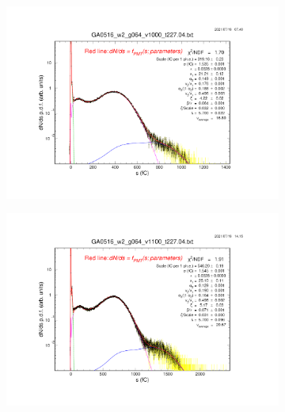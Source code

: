 \begin{figure}[b]
	\centering
	\begin{subfigure}[c]{0.42\linewidth}
		\centering
		\includegraphics[width=\linewidth, trim={6cm 6cm 75mm 85mm},clip]{figures/GA0516_w2_g064_v1000_6mm_log.04.png}
		\vspace{0mm}
	\end{subfigure}%
	\begin{subfigure}[c]{0.42\linewidth}
		\centering
		\includegraphics[width=\linewidth, trim={75mm 6cm 6cm 85mm},clip]{figures/GA0516_w2_g064_v1100_6mm_log.04.png}
		\vspace{0mm}
	\end{subfigure}%
	\vspace{0mm}
	\begin{subfigure}[c]{0.42\linewidth}

\end{subfigure}
\end{figure}

